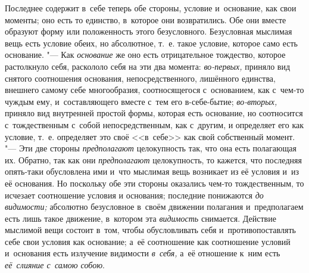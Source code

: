 Последнее содержит в~себе теперь обе стороны, условие и~основание, как свои
моменты; оно есть то единство, в~которое они возвратились. Обе они вместе
образуют форму или положенность этого безусловного. Безусловная мыслимая вещь
есть условие обеих, но абсолютное, т.~е. такое условие, которое само есть
основание. "--- Как {\em основание} же оно есть отрицательное тождество,
которое растолкнуло себя, раскололо себя на эти два момента: {\em во-первых,}
приняло вид снятого соотношения основания, непосредственного, лишённого
единства, внешнего самому себе многообразия, соотносящегося с~основанием, как
с~чем-то чуждым ему, и~составляющего вместе с~тем его в-себе-бытие;
{\em во-вторых,} приняло вид внутренней простой формы, которая есть основание,
но соотносится с~тождественным с~собой непосредственным, как с~другим, и
определяет его как условие, т.~е. определяет это своё <<в~себе>> как свой
собственный момент. "--- Эти две стороны {\em предполагают} целокупность так,
что она есть полагающая их. Обратно, так как они {\em предполагают}
целокупность, то кажется, что последняя опять-таки обусловлена ими и~что
мыслимая вещь возникает из её условия и~из её основания. Но поскольку обе эти
стороны оказались чем-то тождественным, то исчезает соотношение условия и
основания; последние понижаются {\em до видимости;} абсолютно безусловное
в~своём движении полагания и~предполагаем есть лишь такое движение, в~котором
эта {\em видимость} снимается. Действие мыслимой вещи состоит в~том, чтобы
обусловливать себя и~противопоставлять себе свои условия как основание; а~её
соотношение как соотношение условий и~основания есть излучение видимости
{\em в~себя,} а~её отношение к~ним есть {\em её~слияние с~самою собою}.


